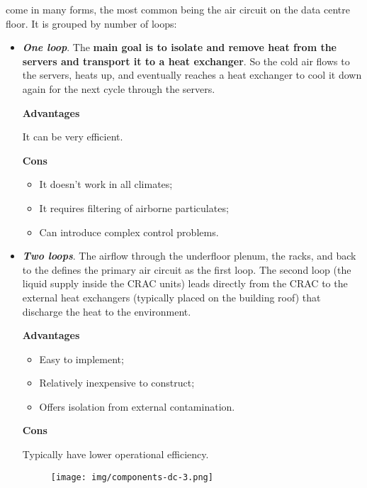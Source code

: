 \highspace
{} come in many forms, the most common being the air circuit on the data centre floor. 
It is grouped by number of loops:
\begin{itemize}
	\item \textbf{\emph{One loop}}. The \textbf{main goal is to isolate and remove heat from the servers and transport it to a heat exchanger}. So the cold air flows to the servers, heats up, and eventually reaches a heat exchanger to cool it down again for the next cycle through the servers.
	\begin{flushleft}
		\textcolor{Green3}{ \textbf{Advantages}}
	\end{flushleft}
	It can be very efficient.
	\begin{flushleft}
		\textcolor{Red2}{ \textbf{Cons}}
	\end{flushleft}
	\begin{itemize}
		\item It doesn't work in all climates;
		\item It requires filtering of airborne particulates;
		\item Can introduce complex control problems.
	\end{itemize}
	
	\item \textbf{\emph{Two loops}}. The airflow through the underfloor plenum, the racks, and back to the  defines the primary air circuit as the first loop. The second loop (the liquid supply inside the CRAC units) leads directly from the CRAC to the external heat exchangers (typically placed on the building roof) that discharge the heat to the environment.
	\begin{flushleft}
		\textcolor{Green3}{ \textbf{Advantages}}
	\end{flushleft}
	\begin{itemize}
		\item Easy to implement;
		\item Relatively inexpensive to construct;
		\item Offers isolation from external contamination.
	\end{itemize}
	\begin{flushleft}
		\textcolor{Red2}{ \textbf{Cons}}
	\end{flushleft}
	Typically have lower operational efficiency.
	\begin{figure}[!htp]
		\centering
		\texttt{[image: img/components-dc-3.png]}
	\end{figure}
	\newpage
	

\end{itemize}

